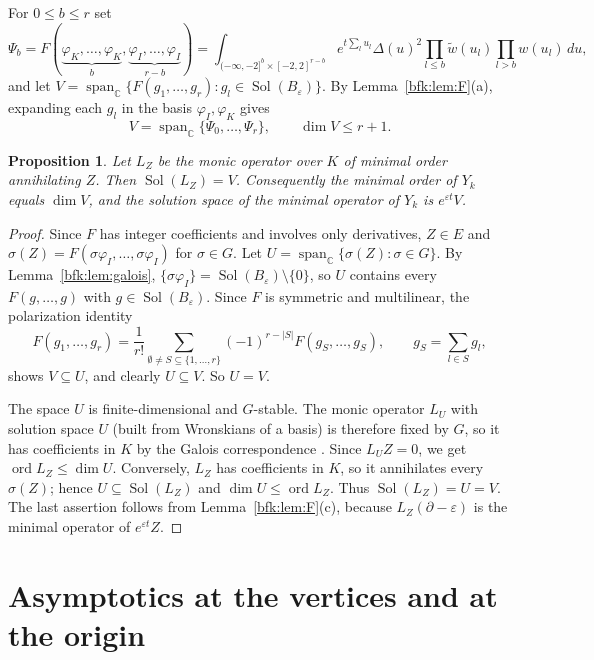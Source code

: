\documentclass[11pt,a4paper]{article}
\newtheorem{proposition}[theorem]{Proposition}
\theoremstyle{definition}
\theoremstyle{remark}
\numberwithin{equation}{section}
\newcommand{\C}{\mathbb{C}}
\DeclareMathOperator{\ord}{ord}
\DeclareMathOperator{\Sol}{Sol}
\DeclareMathOperator{\spn}{span}
\begin{document}
For $0\le b\le r$ set
\[
\Psi_b=F(\underbrace{\varphi_K,\dots,\varphi_K}_{b},\underbrace{\varphi_I,\dots,\varphi_I}_{r-b})
=\int_{(-\infty,-2]^b\times[-2,2]^{r-b}}e^{t\sum_lu_l}\Delta(u)^2\prod_{l\le b}\tilde w(u_l)\prod_{l>b}w(u_l)\,du ,
\]
and let $V=\spn_\C\{F(g_1,\dots,g_r):g_l\in\Sol(B_\varepsilon)\}$. By Lemma~\ref{bfk:lem:F}(a), expanding each $g_l$ in the basis $\varphi_I,\varphi_K$ gives
\begin{equation}\label{bfk:eq:Vspan}
V=\spn_\C\{\Psi_0,\dots,\Psi_r\},\qquad \dim V\le r+1 .
\end{equation}

\begin{proposition}\label{bfk:prop:V}
Let $L_Z$ be the monic operator over $K$ of minimal order annihilating $Z$. Then $\Sol(L_Z)=V$. Consequently the minimal order of $Y_k$ equals $\dim V$, and the solution space of the minimal operator of $Y_k$ is $e^{\varepsilon t}V$.
\end{proposition}

\begin{proof}
Since $F$ has integer coefficients and involves only derivatives, $Z\in E$ and $\sigma(Z)=F(\sigma\varphi_I,\dots,\sigma\varphi_I)$ for $\sigma\in G$. Let $U=\spn_\C\{\sigma(Z):\sigma\in G\}$. By Lemma~\ref{bfk:lem:galois}, $\{\sigma\varphi_I\}=\Sol(B_\varepsilon)\setminus\{0\}$, so $U$ contains every $F(g,\dots,g)$ with $g\in\Sol(B_\varepsilon)$. Since $F$ is symmetric and multilinear, the polarization identity
\[
F(g_1,\dots,g_r)=\frac1{r!}\sum_{\emptyset\ne S\subseteq\{1,\dots,r\}}(-1)^{r-|S|}F(g_S,\dots,g_S),\qquad g_S=\sum_{l\in S}g_l ,
\]
shows $V\subseteq U$, and clearly $U\subseteq V$. So $U=V$.

The space $U$ is finite-dimensional and $G$-stable. The monic operator $L_U$ with solution space $U$ (built from Wronskians of a basis) is therefore fixed by $G$, so it has coefficients in $K$ by the Galois correspondence \cite{vdPS03}. Since $L_UZ=0$, we get $\ord L_Z\le\dim U$. Conversely, $L_Z$ has coefficients in $K$, so it annihilates every $\sigma(Z)$; hence $U\subseteq\Sol(L_Z)$ and $\dim U\le\ord L_Z$. Thus $\Sol(L_Z)=U=V$. The last assertion follows from Lemma~\ref{bfk:lem:F}(c), because $L_Z(\partial-\varepsilon)$ is the minimal operator of $e^{\varepsilon t}Z$.
\end{proof}

\section{Asymptotics at the vertices and at the origin}\label{bfk:sec:asym}
\end{document}
